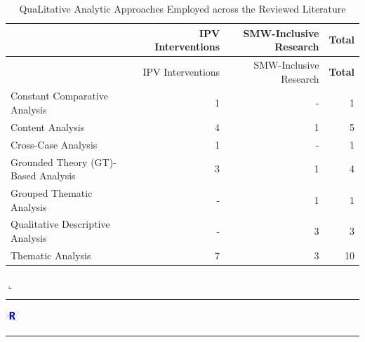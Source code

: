 \documentclass[11pt,]{tufte-book}
\newenvironment{Shaded}{}{}
\newcommand{\KeywordTok}[1]{\textcolor[rgb]{0.00,0.44,0.13}{\textbf{#1}}}
\newcommand{\DataTypeTok}[1]{\textcolor[rgb]{0.56,0.13,0.00}{#1}}
\newcommand{\DecValTok}[1]{\textcolor[rgb]{0.25,0.63,0.44}{#1}}
\newcommand{\StringTok}[1]{\textcolor[rgb]{0.25,0.44,0.63}{#1}}
\newcommand{\OperatorTok}[1]{\textcolor[rgb]{0.40,0.40,0.40}{#1}}
\newcommand{\NormalTok}[1]{#1}
\newcommand{\Rrule}{
    \vspace*{1em}
    \noindent
    \hspace{-1em}
    \includegraphics[width=0.5cm]{auxDocs/Rlogo.png}
    \textcolor{Rblue}{
        \rule[0.1in]{0.90\linewidth}{0.02mm}
    }
    \vspace{-1.35em}
}
\newcommand{\Rerule}{
    \noindent
    \hspace{-1em}
    \textcolor{Rblue}{
        $\llcorner$\rule[-0.4mm]{\linewidth}{0.02mm}
    }
}
\begin{document}
\begin{longtable}[]{@{}lrrr@{}}
\caption{QuaLitative Analytic Approaches Employed across the Reviewed
Literature \label{tbl:aql}}\tabularnewline
\toprule
& IPV Interventions & SMW-Inclusive Research &
\textbf{Total}\tabularnewline
\midrule
\endfirsthead
\toprule
& IPV Interventions & SMW-Inclusive Research &
\textbf{Total}\tabularnewline
\midrule
\endhead
Constant Comparative Analysis & 1 & - & 1\tabularnewline
Content Analysis & 4 & 1 & 5\tabularnewline
Cross-Case Analysis & 1 & - & 1\tabularnewline
Grounded Theory (GT)-Based Analysis & 3 & 1 & 4\tabularnewline
Grouped Thematic Analysis & - & 1 & 1\tabularnewline
Qualitative Descriptive Analysis & - & 3 & 3\tabularnewline
Thematic Analysis & 7 & 3 & 10\tabularnewline
\bottomrule
\end{longtable}

\Rerule

\Rrule

\begin{Shaded}
\end{Shaded}
\end{document}

